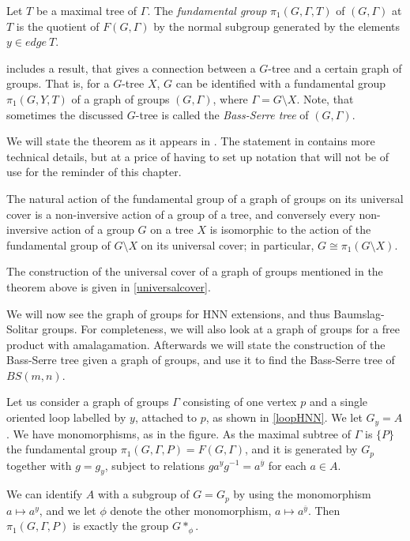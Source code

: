 \begin{definition}
    \label{def:graph_of_groups_fund_group}
    Let $T$ be a maximal tree of $\Gamma$. The \emph{fundamental group} $\pi_1(G,\Gamma,T)$ of $(G,\Gamma)$ at $T$ is the quotient of $F(G,\Gamma)$ by the normal subgroup generated by the elements $y \in edge\:T$.
\end{definition}

\cite[section I.5.4]{serre_trees_1980} includes a result, that gives a connection between a $G$-tree and a certain graph of groups. That is, for a $G$-tree $X$, $G$ can be identified with a fundamental group $\pi_1(G,Y,T)$ of a graph of groups $(G,\Gamma)$, where $\Gamma = G\setminus X$.  Note, that sometimes the discussed $G$-tree is called the \emph{Bass-Serre tree} of $(G,\Gamma)$.

We will state the theorem as it appears in \cite[Corollary 7.45]{Ba}. The statement in \cite[Section I.5.4, Theorem 13]{serre_trees_1980} contains more technical details, but at a price of having to set up notation that will not be of use for the reminder of this chapter.

\begin{theorem}\label{structuretheorem}
   The natural action of the fundamental group of a graph of groups on its universal cover is a non-inversive action of a group of a tree, and conversely every non-inversive action of a group $G$ on a tree $X$ is isomorphic to the action of the fundamental group of $G\setminus X$ on its universal cover; in particular, $G \cong \pi_1( G\setminus X)$.
\end{theorem}

\begin{remark}
    The construction of the universal cover of a graph of groups mentioned in the theorem above is given in \ref{universalcover}.
\end{remark}

We will now see the graph of groups for HNN extensions, and thus Baumslag-Solitar groups. For completeness, we will also look at a graph of groups for a free product with amalagamation. Afterwards we will state the construction of the Bass-Serre tree given a graph of groups, and use it to find the Bass-Serre tree of $BS(m,n)$.


\begin{example}\cite[section I.5.1]{serre_trees_1980}\label{HNN graph}
    Let us consider a graph of groups $\Gamma$ consisting of one vertex $p$ and a single oriented loop labelled by $y$, attached to $p$,  as shown in \ref{loopHNN}. We let $G_y = A$. We have monomorphisms, as in the figure. As the maximal subtree of $\Gamma$ is $\{P\}$ the fundamental group $\pi_1(G,\Gamma,P) = F(G,\Gamma)$, and it is generated by $G_p$ together with $g = g_y$, subject to relations $ga^yg^{-1} = a^{\overline{y}}$ for each $a \in A$.

    We can identify $A$ with a subgroup of $G = G_p$ by using the monomorphism $a \mapsto a^y$, and we let $\phi$ denote the other monomorphism, $a \mapsto a^{\overline{y}}$. Then $\pi_1(G,\Gamma,P)$ is exactly the group $G \ast _\phi$.
\end{example}

